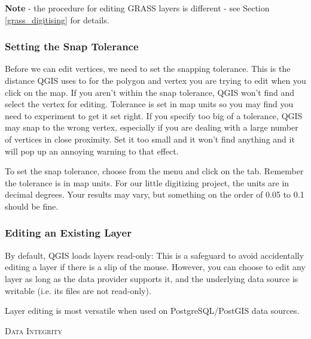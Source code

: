 \textbf{Note} - the procedure for editing GRASS layers is different - see
Section \ref{grass_digitising} for details.

\subsubsection{Setting the Snap Tolerance}

Before we can edit vertices, we need to set the snapping tolerance. This is the 
distance QGIS uses to  for the polygon and vertex you are trying to
edit when you click on the map. If you aren't within the snap tolerance,
QGIS won't find and select the vertex for editing. Tolerance is set in map
units so you may find you need to experiment to get it set right. If you
specify too big of a tolerance, QGIS may snap to the wrong vertex,
especially if you are dealing with a large number of vertices in close
proximity. Set it too small and it won't find anything and it will pop up an
annoying warning to that effect. 

To set the snap tolerance, choose  from the
 menu and click on the  tab.  Remember the
tolerance is in map units. For our little digitizing project, the units
are in decimal degrees.  Your results may vary, but something on the order
of 0.05 to 0.1 should be fine. 

\subsubsection{Editing an Existing Layer}
\label{sec:edit_existing_layer}

By default, QGIS loads layers read-only: This is a safeguard
to avoid accidentally editing a layer if there is a slip of the mouse.
However, you can choose to edit any layer as long as the data provider supports it,
and the underlying data source is writable (i.e. its files are not read-only).

Layer editing is most versatile when used on PostgreSQL/PostGIS data sources. 

\begin{Tip}[ht]\caption{\textsc{Data Integrity}}
\end{Tip}

